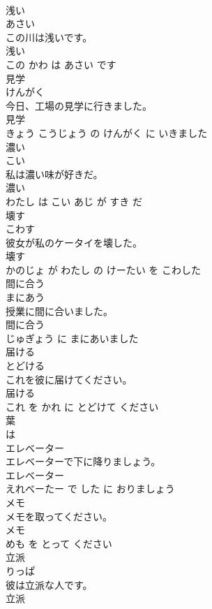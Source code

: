 \documentclass[8pt]{extreport}
\begin{document}
\begin{CJK}{UTF8}{min}
\\	浅い	
\\	あさい			
\\	この川は浅いです。	
\\	浅い 
\\	この かわ は あさい です			
\\	見学	
\\	けんがく			
\\	今日、工場の見学に行きました。	
\\	見学 
\\	きょう こうじょう の けんがく に いきました			
\\	濃い	
\\	こい			
\\	私は濃い味が好きだ。	
\\	濃い 
\\	わたし は こい あじ が すき だ			
\\	壊す	
\\	こわす			
\\	彼女が私のケータイを壊した。	
\\	壊す 
\\	かのじょ が わたし の けーたい を こわした			
\\	間に合う	
\\	まにあう			
\\	授業に間に合いました。	
\\	間に合う 
\\	じゅぎょう に まにあいました			
\\	届ける	
\\	とどける			
\\	これを彼に届けてください。	
\\	届ける 
\\	これ を かれ に とどけて ください			
\\	葉	
\\	は			
\\	エレベーター	
\\	エレベーターで下に降りましょう。	
\\	エレベーター 
\\	えれべーたー で した に おりましょう			
\\	メモ	
\\	メモを取ってください。	
\\	メモ 
\\	めも を とって ください			
\\	立派	
\\	りっぱ			
\\	彼は立派な人です。	
\\	立派 

\end{CJK}
\end{document}
